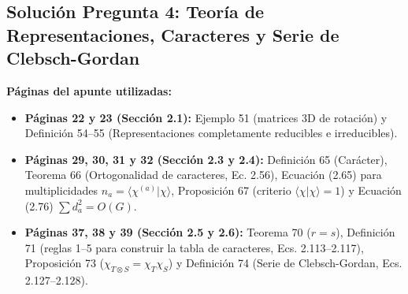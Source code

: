 \documentclass[11pt, a4paper]{article}
\begin{document}
\newpage

\subsection*{\textcolor{primary}{Solución Pregunta 4: Teoría de Representaciones, Caracteres y Serie de Clebsch-Gordan}}
\textbf{Páginas del apunte utilizadas:}
\begin{itemize}
    \item \textbf{Páginas 22 y 23 (Sección 2.1):} Ejemplo 51 (matrices 3D de rotación) y Definición 54--55 (Representaciones completamente reducibles e irreducibles).
    \item \textbf{Páginas 29, 30, 31 y 32 (Sección 2.3 y 2.4):} Definición 65 (Carácter), Teorema 66 (Ortogonalidad de caracteres, Ec. 2.56), Ecuación (2.65) para multiplicidades $n_a = \langle \chi^{(a)} | \chi \rangle$, Proposición 67 (criterio $\langle \chi | \chi \rangle = 1$) y Ecuación (2.76) $\sum d_a^2 = O(G)$.
    \item \textbf{Páginas 37, 38 y 39 (Sección 2.5 y 2.6):} Teorema 70 ($r=s$), Definición 71 (reglas 1--5 para construir la tabla de caracteres, Ecs. 2.113--2.117), Proposición 73 ($\chi_{T\otimes S} = \chi_T \chi_S$) y Definición 74 (Serie de Clebsch-Gordan, Ecs. 2.127--2.128).
\end{itemize}
\end{document}

